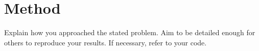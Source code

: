 \section{Method}
\label{sec:method}

Explain how you approached the stated problem. Aim to be detailed enough for others to reproduce your results. If necessary, refer to your code.
